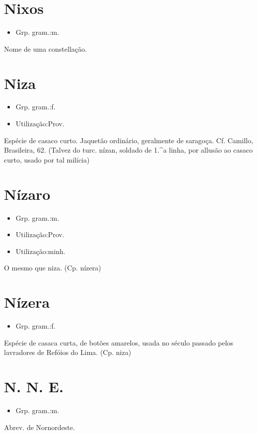 \section{Nixos}
\begin{itemize}
\item {Grp. gram.:m.}
\end{itemize}
Nome de uma constellação.
\section{Niza}
\begin{itemize}
\item {Grp. gram.:f.}
\end{itemize}
\begin{itemize}
\item {Utilização:Prov.}
\end{itemize}
Espécie de casaco curto.
Jaquetão ordinário, geralmente de saragoça. Cf. Camillo, \textunderscore Brasileira\textunderscore , 62.
(Talvez do turc. \textunderscore nízan\textunderscore , soldado de 1.^a linha, por allusão ao casaco curto, usado por tal milícia)
\section{Nízaro}
\begin{itemize}
\item {Grp. gram.:m.}
\end{itemize}
\begin{itemize}
\item {Utilização:Prov.}
\end{itemize}
\begin{itemize}
\item {Utilização:minh.}
\end{itemize}
O mesmo que \textunderscore niza\textunderscore .
(Cp. \textunderscore nízera\textunderscore )
\section{Nízera}
\begin{itemize}
\item {Grp. gram.:f.}
\end{itemize}
Espécie de casaca curta, de botões amarelos, usada no século passado pelos lavradores de Refóios do Lima.
(Cp. \textunderscore niza\textunderscore )
\section{N. N. E.}
\begin{itemize}
\item {Grp. gram.:m.}
\end{itemize}
Abrev. de \textunderscore Nornordeste\textunderscore .
